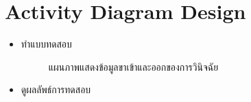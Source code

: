 \documentclass[12pt,oneside,openright,a4paper]{cpe-thai-project}
\begin{document}
\section{Activity Diagram Design}
   \begin{itemize}
    \item ทำแบบทดสอบ
    \begin{figure}[!ht]\centering
      \setlength{\fboxrule}{0.2mm} %
      \setlength{\fboxsep}{1cm}
      \caption{แผนภาพแสดงข้อมูลขาเข้าและออกของการวินิจฉัย}\label{fig:system}
     \end{figure}
    \newpage
    \item ดูผลลัพธ์การทดสอบ
    \begin{figure}[!ht]\centering
      \setlength{\fboxrule}{0.2mm} %
      \setlength{\fboxsep}{1cm}

\end{figure}
\end{itemize}
\end{document}
